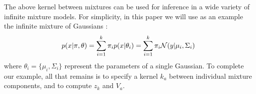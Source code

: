 The above kernel between mixtures can be used for inference in a wide variety of infinite mixture models.  For simplicity, in this paper we will use as an example the infinite mixture of Gaussians \cite{rasmussen2000infinite}:
%
\begin{align}
p(x | {\bf{\pi}}, {\bf{\theta}}) 
= \sum_{i = 1}^k \pi_i p( x | \theta_i )
= \sum_{i = 1}^k \pi_i \mathcal{N}\!\left(y \middle| \mu_i,\Sigma_i\right)
\end{align}
%
where $\theta_i = \{ \mu_i, \Sigma_i \}$ represent the parameters of a single Gaussian.
%
%
%
%
%
%
%
%
%
%
%
%
To complete our example, all that remains is to specify a kernel $k_a$ between individual mixture components, and to compute $z_k$ and $V_a$.  
%
%
